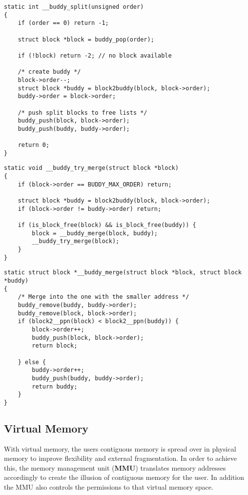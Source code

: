 \newpar{}
\begin{lstlisting}[style=bright_C++]
static int __buddy_split(unsigned order)
{
    if (order == 0) return -1;

    struct block *block = buddy_pop(order);

    if (!block) return -2; // no block available

    /* create buddy */
    block->order--;
    struct block *buddy = block2buddy(block, block->order);
    buddy->order = block->order;

    /* push split blocks to free lists */
    buddy_push(block, block->order);
    buddy_push(buddy, buddy->order);

    return 0;
}
\end{lstlisting}

\newpar{}
\begin{lstlisting}[style=bright_C++]
static void __buddy_try_merge(struct block *block)
{
    if (block->order == BUDDY_MAX_ORDER) return;

    struct block *buddy = block2buddy(block, block->order);
    if (block->order != buddy->order) return;

    if (is_block_free(block) && is_block_free(buddy)) {
        block = __buddy_merge(block, buddy);
        __buddy_try_merge(block);
    }
}
\end{lstlisting}
\newpar{}
\begin{lstlisting}[style=bright_C++]
static struct block *__buddy_merge(struct block *block, struct block *buddy)
{
    /* Merge into the one with the smaller address */
    buddy_remove(buddy, buddy->order);
    buddy_remove(block, block->order);
    if (block2__ppn(block) < block2__ppn(buddy)) {
        block->order++;
        buddy_push(block, block->order);
        return block;

    } else {
        buddy->order++;
        buddy_push(buddy, buddy->order);
        return buddy;
    }
}
\end{lstlisting}

\subsection{Virtual Memory}
With virtual memory, the users contiguous memory is spread over in physical memory to improve flexibility and external fragmentation.
In order to achieve this, the memory management unit (\textbf{MMU}) translates memory addresses accordingly to create the illusion of contiguous memory for the user. In addition the MMU also controls the permissions to that virtual memory space.
